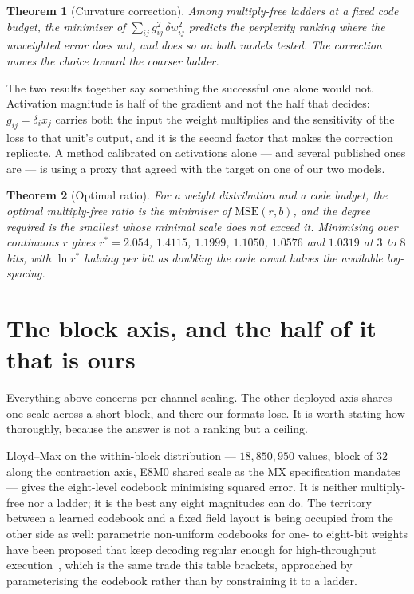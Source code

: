 \documentclass[11pt]{article}
\newtheorem{theorem}{Theorem}
\theoremstyle{definition}
\begin{document}
\begin{theorem}[Curvature correction]\label{thm:curvature}
Among multiply-free ladders at a fixed code budget, the minimiser of
$\sum_{ij} g_{ij}^{2}\,\delta w_{ij}^{2}$ predicts the perplexity ranking where
the unweighted error does not, and does so on both models tested. The correction
moves the choice toward the coarser ladder.
\end{theorem}

The two results together say something the successful one alone would not.
Activation magnitude is half of the gradient and not the half that decides:
$g_{ij} = \delta_i x_j$ carries both the input the weight multiplies and the
sensitivity of the loss to that unit's output, and it is the second factor that
makes the correction replicate. A method calibrated on activations alone --- and
several published ones are --- is using a proxy that agreed with the target on
one of our two models.

\begin{theorem}[Optimal ratio]\label{thm:optratio}
For a weight distribution and a code budget, the optimal multiply-free ratio is
the minimiser of $\mathrm{MSE}(r,b)$, and the degree required is the smallest
whose minimal scale does not exceed it. Minimising over continuous $r$ gives
$r^{*}=2.054$, $1.4115$, $1.1999$, $1.1050$, $1.0576$ and $1.0319$ at $3$ to
$8$ bits,
with $\ln r^{*}$ halving per bit as doubling the code count halves the available
log-spacing.
\end{theorem}

\section{The block axis, and the half of it that is ours}
\label{sec:blockbound}

Everything above concerns per-channel scaling. The other deployed axis shares
one scale across a short block, and there our formats lose. It is worth stating
how thoroughly, because the answer is not a ranking but a ceiling.

Lloyd--Max on the within-block distribution --- $18{,}850{,}950$ values, block of
$32$ along the contraction axis, E8M0 shared scale as the MX specification
mandates --- gives the eight-level codebook minimising squared error. It is
neither multiply-free nor a ladder; it is the best any eight magnitudes can do.
The territory between a learned codebook and a fixed field layout is being
occupied from the other side as well: parametric non-uniform codebooks for one- to
eight-bit weights have been proposed that keep decoding regular enough for
high-throughput execution~\cite{gao2026cubicquant}, which is the same trade this
table brackets, approached by parameterising the codebook rather than by
constraining it to a ladder.
\end{document}
